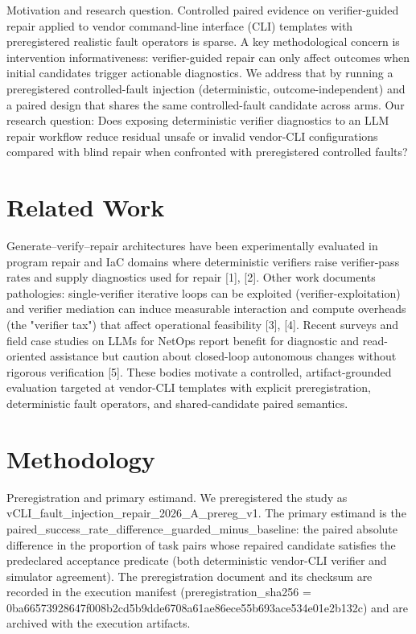 \documentclass[conference]{IEEEtran}
\begin{document}
Motivation and research question. Controlled paired evidence on verifier-guided repair applied to vendor command-line interface (CLI) templates with preregistered realistic fault operators is sparse. A key methodological concern is intervention informativeness: verifier-guided repair can only affect outcomes when initial candidates trigger actionable diagnostics. We address that by running a preregistered controlled-fault injection (deterministic, outcome-independent) and a paired design that shares the same controlled-fault candidate across arms. Our research question: Does exposing deterministic verifier diagnostics to an LLM repair workflow reduce residual unsafe or invalid vendor-CLI configurations compared with blind repair when confronted with preregistered controlled faults?

\section{Related Work}
Generate--verify--repair architectures have been experimentally evaluated in program repair and IaC domains where deterministic verifiers raise verifier-pass rates and supply diagnostics used for repair [1], [2]. Other work documents pathologies: single-verifier iterative loops can be exploited (verifier-exploitation) and verifier mediation can induce measurable interaction and compute overheads (the "verifier tax") that affect operational feasibility [3], [4]. Recent surveys and field case studies on LLMs for NetOps report benefit for diagnostic and read-oriented assistance but caution about closed-loop autonomous changes without rigorous verification [5]. These bodies motivate a controlled, artifact-grounded evaluation targeted at vendor-CLI templates with explicit preregistration, deterministic fault operators, and shared-candidate paired semantics.

\section{Methodology}
Preregistration and primary estimand. We preregistered the study as vCLI\_fault\_injection\_repair\_2026\_A\_prereg\_v1. The primary estimand is the paired\_success\_rate\_difference\_guarded\_minus\_baseline: the paired absolute difference in the proportion of task pairs whose repaired candidate satisfies the predeclared acceptance predicate (both deterministic vendor-CLI verifier and simulator agreement). The preregistration document and its checksum are recorded in the execution manifest (preregistration\_sha256 = 0ba66573\allowbreak{}928647f0\allowbreak{}08b2cd5b\allowbreak{}9dde6708\allowbreak{}a61ae86e\allowbreak{}ce55b693\allowbreak{}ace534e0\allowbreak{}1e2b132c) and are archived with the execution artifacts.
\end{document}
